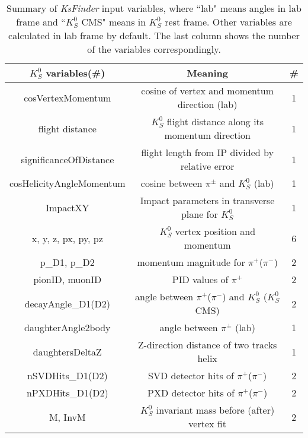 \begin{table}[htbp]
	\centering 
	\small
	\begin{tabular}{|c|c|c|} 
		\hline
		$K_S^0$ variables(\#) &  Meaning & \#\\
		\hline
		{cosVertexMomentum}  & cosine of vertex and momentum direction (lab) & 1\\
		flight distance& $K_S^0$ flight distance along its momentum direction & 1\\
		significanceOfDistance  & flight length from IP divided by relative error  & 1\\
		cosHelicityAngleMomentum & cosine between $\pi^{\pm}$ and $K_S^0$ (lab) & 1\\
		ImpactXY & Impact parameters in transverse plane for $K_S^0$ & 1\\
		x, y, z, px, py, pz& $K_S^0$ vertex position and momentum & 6\\
		p\_D1, p\_D2 & momentum magnitude for $\pi^+$($\pi^-$) & 2\\
		pionID, muonID & PID values of $\pi^+$ & 2\\
		decayAngle\_D1(D2)& angle between $\pi^+$($\pi^-$) and $K_S^0$ ($K_S^0$ CMS) & 2\\
		daughterAngle2body & angle between $\pi^{\pm}$ (lab) & 1\\
		daughtersDeltaZ & Z-direction distance of two tracks helix & 1\\
		nSVDHits\_D1(D2)& SVD detector hits of  $\pi^+$($\pi^-$) & 2\\
		nPXDHits\_D1(D2)& PXD detector hits of  $\pi^+$($\pi^-$) & 2\\
		M, InvM & $K_S^0$ invariant mass before (after) vertex fit & 2\\
		\hline
	\end{tabular}
	\caption{\small Summary of \textit{KsFinder} input variables, where ``lab" means angles in lab frame and  ``$K_S^0$ CMS" means in $K_S^0$ rest frame. Other variables are calculated in lab frame by default. The last column shows the number of the variables correspondingly.}
	\label{tab:ks_vars}
\end{table}

